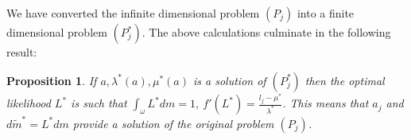 \documentclass{article}
\newtheorem{proposition}{Proposition}
\begin{document}

We have converted the infinite dimensional problem $(P_j)$ into a finite dimensional problem $(P_j^*)$. The above calculations culminate in the following result:
\begin{proposition}
If $a, \lambda^*(a), \mu^*(a)$ is a solution of $(P_j^*)$ then the optimal likelihood $L^*$ is such that $\int_{\omega} L^* dm=1,\ f'(L^*)=\frac{ l_j-\mu^*}{\lambda^*}$. This means that $a_j$ and $d\tilde{m}^*=L^*dm$ provide a solution of the original problem $(P_j)$.
\end{proposition}
\end{document}
